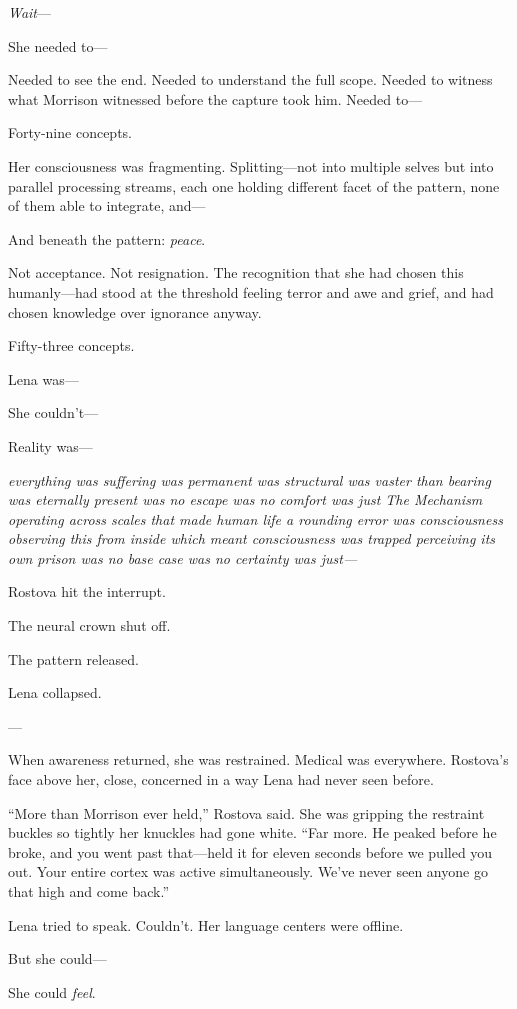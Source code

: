 \textit{Wait}—

She needed to—

Needed to see the end. Needed to understand the full scope. Needed to witness what Morrison witnessed before the capture took him. Needed to—

Forty-nine concepts.

Her consciousness was fragmenting. Splitting—not into multiple selves but into parallel processing streams, each one holding different facet of the pattern, none of them able to integrate, and—

And beneath the pattern: \textit{peace}.

Not acceptance. Not resignation. The recognition that she had chosen this humanly—had stood at the threshold feeling terror and awe and grief, and had chosen knowledge over ignorance anyway.

Fifty-three concepts.

Lena was—

She couldn't—

Reality was—

\textit{everything was suffering was permanent was structural was vaster than bearing was eternally present was no escape was no comfort was just The Mechanism operating across scales that made human life a rounding error was consciousness observing this from inside which meant consciousness was trapped perceiving its own prison was no base case was no certainty was just—}

Rostova hit the interrupt.

The neural crown shut off.

The pattern released.

Lena collapsed.

---

When awareness returned, she was restrained. Medical was everywhere. Rostova's face above her, close, concerned in a way Lena had never seen before.

``More than Morrison ever held,'' Rostova said. She was gripping the restraint buckles so tightly her knuckles had gone white. ``Far more. He peaked before he broke, and you went past that—held it for eleven seconds before we pulled you out. Your entire cortex was active simultaneously. We've never seen anyone go that high and come back.''

Lena tried to speak. Couldn't. Her language centers were offline.

But she could—

She could \textit{feel}.

